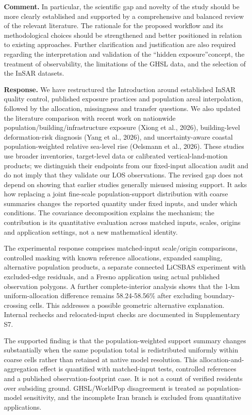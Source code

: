 \documentclass[11pt,a4paper]{article}
\begin{document}
\textbf{Comment.} In particular, the scientific gap and novelty of the study should be more clearly established and supported by a comprehensive and balanced review of the relevant literature. The rationale for the proposed workflow and its methodological choices should be strengthened and better positioned in relation to existing approaches. Further clarification and justification are also required regarding the interpretation and validation of the “hidden exposure”concept, the treatment of observability, the limitations of the GHSL data, and the selection of the InSAR datasets.

\textbf{Response.} We have restructured the Introduction around established InSAR quality control, published exposure practices and population areal interpolation, followed by the allocation, missingness and transfer questions. We also updated the literature comparison with recent work on nationwide population/building/infrastructure exposure (Xiong et al., 2026), building-level deformation-risk diagnosis (Yang et al., 2026), and uncertainty-aware coastal population-weighted relative sea-level rise (Oelsmann et al., 2026). These studies use broader inventories, target-level data or calibrated vertical-land-motion products; we distinguish their endpoints from our fixed-input allocation audit and do not imply that they validate our LOS observations. The revised gap does not depend on showing that earlier studies generally misused missing support. It asks how replacing a joint fine-scale population-support distribution with coarse summaries changes the reported quantity under fixed inputs, and under which conditions. The covariance decomposition explains the mechanism; the contribution is its quantitative evaluation across matched inputs, scales, origins and application settings, not a new mathematical identity.

The experimental response comprises matched-input scale/origin comparisons, controlled masking with known reference allocations, expanded sampling, alternative population products, a separate connected LiCSBAS experiment with excluded-edge residuals, and a Fresno application using actual published observation polygons. A further complete-interior analysis shows that the 1-km uniform-allocation difference remains 58.24-58.56\% after excluding boundary-crossing cells. This addresses a possible geometric alternative explanation. Internal rechecks and relocated-input checks are documented in Supplementary S7.

The supported finding is that the population-weighted support summary changes substantially when the same population total is redistributed uniformly within coarse cells rather than retained at native model resolution. This allocation-and-aggregation effect is quantified with matched-input tests, controlled references and a published observation-footprint case. It is not a count of verified residents over subsiding ground. GHSL/WorldPop disagreement is treated as population-model sensitivity, and the incomplete Iran branch is excluded from quantitative applications.
\end{document}
